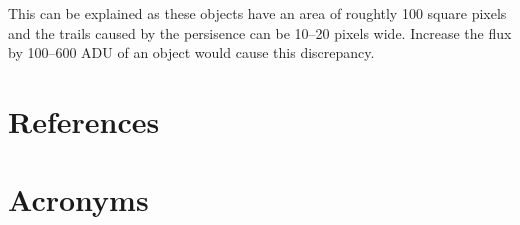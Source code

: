 \documentclass[DM,authoryear,toc]{lsstdoc}
\begin{document}
This can be explained as these objects have an area of roughtly 100 square pixels and the trails caused by the persisence can be 10--20 pixels wide.
Increase the flux by 100--600 ADU of an object would cause this discrepancy.


\appendix
\section{References} \label{sec:bib}
\renewcommand{\refname}{} %


\section{Acronyms} \label{sec:acronyms}

\end{document}
